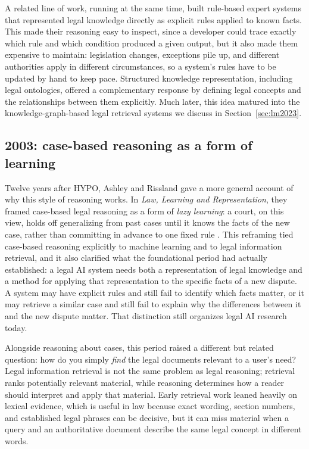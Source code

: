 A related line of work, running at the same time, built rule-based expert systems that represented
legal knowledge directly as explicit rules applied to known facts. This made their reasoning easy to
inspect, since a developer could trace exactly which rule and which condition produced a given
output, but it also made them expensive to maintain: legislation changes, exceptions pile up, and
different authorities apply in different circumstances, so a system's rules have to be updated by
hand to keep pace. Structured knowledge representation, including legal ontologies, offered a
complementary response by defining legal concepts and the relationships between them explicitly.
Much later, this idea matured into the knowledge-graph-based legal retrieval systems we discuss in
Section~\ref{sec:lm2023}.

\subsection{2003: case-based reasoning as a form of learning}

Twelve years after HYPO, Ashley and Rissland gave a more general account of why this style of
reasoning works. In \emph{Law, Learning and Representation}, they framed case-based legal reasoning
as a form of \emph{lazy learning}: a court, on this view, holds off generalizing from past cases
until it knows the facts of the new case, rather than committing in advance to one fixed rule
\citep{ashley2003}. This reframing tied case-based reasoning explicitly to machine learning and to
legal information retrieval, and it also clarified what the foundational period had actually
established: a legal AI system needs both a representation of legal knowledge and a method for
applying that representation to the specific facts of a new dispute. A system may have explicit
rules and still fail to identify which facts matter, or it may retrieve a similar case and still
fail to explain why the differences between it and the new dispute matter. That distinction still
organizes legal AI research today.

Alongside reasoning about cases, this period raised a different but related question: how do you
simply \emph{find} the legal documents relevant to a user's need? Legal information retrieval is not
the same problem as legal reasoning; retrieval ranks potentially relevant material, while reasoning
determines how a reader should interpret and apply that material. Early retrieval work leaned
heavily on lexical evidence, which is useful in law because exact wording, section numbers, and
established legal phrases can be decisive, but it can miss material when a query and an
authoritative document describe the same legal concept in different words.

